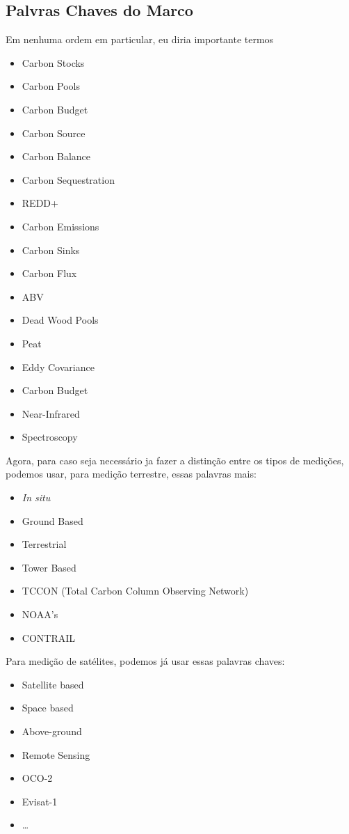 \documentclass{article}[12pt]
\begin{document}
\subsection{Palvras Chaves do Marco}
Em nenhuma ordem em particular, eu diria importante termos
\begin{itemize}
    \item Carbon Stocks
    \item Carbon Pools
    \item Carbon Budget
    \item Carbon Source
    \item Carbon Balance
    \item Carbon Sequestration
    \item REDD+
    \item Carbon Emissions
    \item Carbon Sinks
    \item Carbon Flux
    \item ABV
    \item Dead Wood Pools
    \item Peat
    \item Eddy Covariance %
    \item Carbon Budget
    \item Near-Infrared
    \item Spectroscopy
\end{itemize}
Agora, para caso seja necessário ja fazer a distinção entre os tipos de medições, podemos usar, para
medição terrestre, essas palavras mais:
\begin{itemize}
    \item \textit{In situ} 
    \item Ground Based
    \item Terrestrial
    \item Tower Based
    \item TCCON (Total Carbon Column Observing Network)
    \item NOAA's 
    \item CONTRAIL
\end{itemize}
Para medição de satélites, podemos já usar essas palavras chaves:
\begin{itemize}
    \item Satellite based
    \item Space based
    \item Above-ground %
    \item Remote Sensing
    \item OCO-2
    \item Evisat-1
    \item \dots
\end{itemize}

\end{document}
